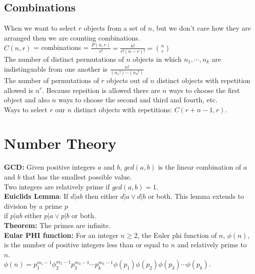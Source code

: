 \documentclass[14pt]{extreport}
\begin{document}
\subsection{Combinations}
When we want to select $r$ objects from a set of $n$, but we don't care how they are arranged then we are counting combinations.\\
$C(n,r)$ = combinations = $\frac{P(n,r)}{r!} = \frac{n!}{r!(n-r)!} = \binom{n}{r}$\\

The number of distinct permutations of $n$ objects in which $n_1 ,\cdots, n_k$ are indistinguable from one another is $\frac{n!}{(n_1!) \cdots (n_k!)}$\\

The number of permutations of $r$ objects out of $n$ distinct objects with repetition allowed is $n^r$. Because repeition is allowed there
are $n$ ways to choose the first object and also $n$ ways to choose the second and third and fourth, etc.\\

Ways to select $r$ our $n$ distinct objects with repetitions: $C(r+n-1,r)$.\\

\section{Number Theory}
{\bf GCD:} Given positive integers $a$ and $b$, $gcd(a,b)$ is the linear combination of $a$ and $b$
that has the smallest possible value.\\

Two integers are relatively prime if $gcd(a,b)=1$.\\
{\bf Euiclids Lemma}: If $d|ab$ then either $d|a \lor d|b$ or both. This lemma extends to division by a prime $p$\\
if $p|ab$ either $p|a \lor p|b$ or both.\\
{\bf Theorem:} The primes are infinite.\\
{\bf Eular PHI function:} For an integer $n \ge 2$, the Euler phi function of $n$, $\phi(n)$, is the number of positive integers
less than or equal to $n$ and relatively prime to $n$.\\
$\phi (n) = p_1^{m_1 -1}\phi _2^{m_2-1}p_3^{m_3-1} \cdots p_k^{m_k-1}\phi (p_1)\phi (p_2)\phi (p_3) \cdots \phi (p_k)$.\\
\end{document}
